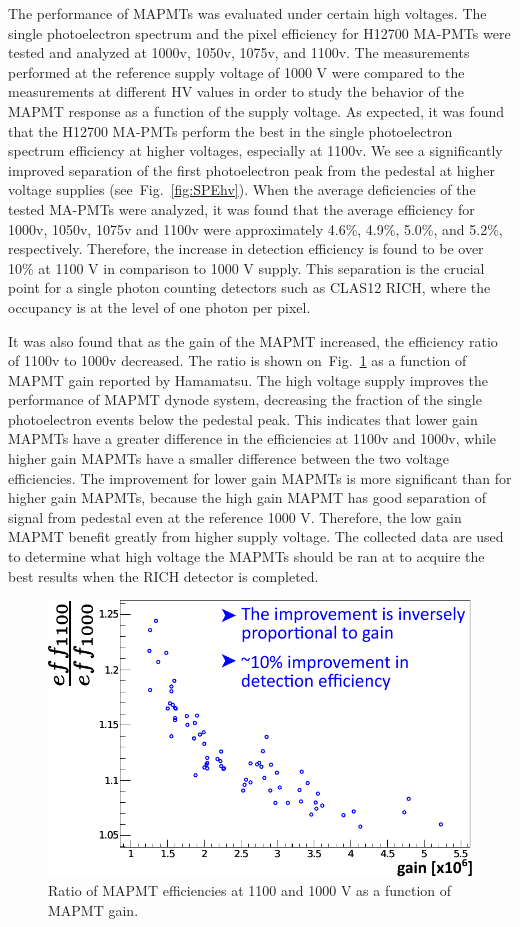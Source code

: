 \documentclass[5p,times,preprint]{elsarticle}
\begin{document}
The performance of MAPMTs was evaluated under certain high voltages.
The single photoelectron spectrum and the pixel efficiency for H12700 MA-PMTs were tested and analyzed at 1000v, 1050v, 1075v, and 1100v.
The measurements performed at the reference supply voltage of 1000 V were compared to the measurements at different HV values in order to study the behavior of the MAPMT response as a function of the supply voltage.
As expected, it was found that the H12700 MA-PMTs perform the best in the single photoelectron spectrum efficiency at higher voltages, especially at 1100v.
We see a significantly improved separation of the first photoelectron peak from the pedestal at higher voltage supplies (see~Fig.~\ref{fig:SPEhv}).
When the average deficiencies of the tested MA-PMTs were analyzed, it was found that the average efficiency for 1000v, 1050v, 1075v and 1100v were approximately 4.6\%, 4.9\%, 5.0\%, and 5.2\%, respectively.
Therefore, the increase in detection efficiency is found to be over 10\% at 1100 V in comparison to 1000 V supply.
This separation is the crucial point for a single photon counting detectors such as CLAS12 RICH, where the occupancy is at the level of one photon per pixel.



It was also found that as the gain of the MAPMT increased, the efficiency ratio of 1100v to 1000v decreased.
The ratio is shown on~Fig.~\ref{fig:effratio} as a function of MAPMT gain reported by Hamamatsu.
The high voltage supply improves the performance of MAPMT dynode system, decreasing the fraction of the single photoelectron events below the pedestal peak.
This indicates that lower gain MAPMTs have a greater difference in the efficiencies at 1100v and 1000v, while higher gain MAPMTs have a smaller difference between the two voltage efficiencies.
The improvement for lower gain MAPMTs is more significant than for higher gain MAPMTs, because the high gain MAPMT has good separation of signal from pedestal even at the reference 1000 V.
Therefore, the low gain MAPMT benefit greatly from higher supply voltage.
The collected data are used to determine what high voltage the MAPMTs should be ran at to acquire the best results when the RICH detector is completed.


\begin{figure}[bt]
	\centering
	\includegraphics[width=0.8\linewidth]{effratio.pdf}
	\caption{Ratio of MAPMT efficiencies at 1100 and 1000 V as a function of MAPMT gain.}
	\label{fig:effratio}
\end{figure}
\end{document}
